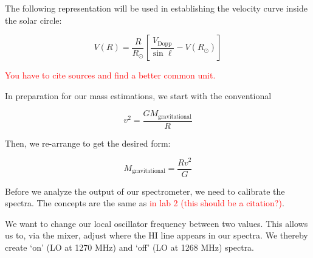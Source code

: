 \documentclass[12pt]{article}
\begin{document}
The following representation will be used in establishing the velocity curve inside the solar circle:

\begin{equation} \label{eq:vel_curve}
V(R) = \frac{R}{R_\odot} \left[ \frac{V_\text{Dopp}}{\sin \ell} - V(R_\odot) \right] 
\end{equation}





\textcolor{red}{You have to cite sources and find a better common unit.}

In preparation for our mass estimations, we start with the conventional

\begin{equation} \label{eq:}
v^2 = \frac{G M_\text{gravitational}}{R} 
\end{equation}

Then, we re-arrange to get the desired form:

\begin{equation} \label{eq:}
M_\text{gravitational} = \frac{R v^2}{G} 
\end{equation}


Before we analyze the output of our spectrometer, we need to calibrate the spectra. The concepts are the same as \textcolor{red}{in lab 2 (this should be a citation?)}.

We want to change our local oscillator frequency between two values. This allows us to, via the mixer, adjust where the HI line appears in our spectra. We thereby create `on' (LO at 1270 MHz) and `off' (LO at 1268 MHz) spectra.
\end{document}
